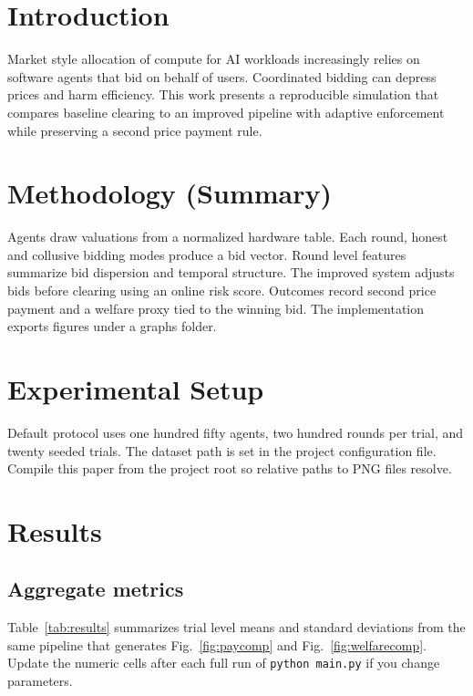 \documentclass[conference]{IEEEtran}
\begin{document}
\section{Introduction}
Market style allocation of compute for AI workloads increasingly relies on software agents that bid on behalf of users. Coordinated bidding can depress prices and harm efficiency. This work presents a reproducible simulation that compares baseline clearing to an improved pipeline with adaptive enforcement while preserving a second price payment rule.

\section{Methodology (Summary)}
Agents draw valuations from a normalized hardware table. Each round, honest and collusive bidding modes produce a bid vector. Round level features summarize bid dispersion and temporal structure. The improved system adjusts bids before clearing using an online risk score. Outcomes record second price payment and a welfare proxy tied to the winning bid. The implementation exports figures under a graphs folder.

\section{Experimental Setup}
Default protocol uses one hundred fifty agents, two hundred rounds per trial, and twenty seeded trials. The dataset path is set in the project configuration file. Compile this paper from the project root so relative paths to PNG files resolve.

\section{Results}

\subsection{Aggregate metrics}
Table~\ref{tab:results} summarizes trial level means and standard deviations from the same pipeline that generates Fig.~\ref{fig:paycomp} and Fig.~\ref{fig:welfarecomp}. Update the numeric cells after each full run of \texttt{python main.py} if you change parameters.
\end{document}
